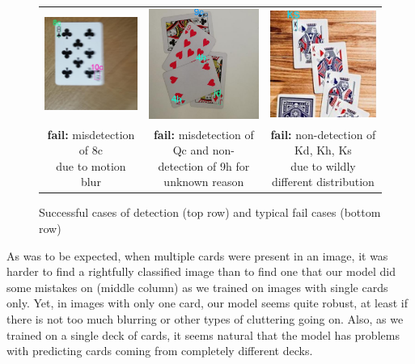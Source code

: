 \documentclass[a4paper]{article}
\begin{document}
\begin{figure}[h]
\begin{tabular}{ccc}
  \includegraphics[width=44mm]{fail1} &   \includegraphics[width=44mm]{fail2} &   \includegraphics[width=44mm]{fail3}\\
\makecell{\textbf{fail:}  misdetection of 8c \\ due to motion blur} & \makecell{\textbf{fail:} misdetection of Qc and non- \\detection of 9h for unknown reason} & \makecell{\textbf{fail:} non-detection of Kd, Kh, Ks \\ due to wildly different distribution} \\[6pt]



\end{tabular}
\caption{Successful cases of detection (top row) and typical fail cases (bottom row) }
\end{figure}
As was to be expected, when multiple cards were present in an image, it was harder to find a rightfully classified image than to find one that our model did some mistakes on (middle column) as we trained on images with single cards only. Yet, in images with only one card, our model seems quite robust, at least if there is not too much blurring or other types of cluttering going on. Also, as we trained on a single deck of cards, it seems natural that the model has problems with predicting cards coming from completely different decks.
\end{document}
